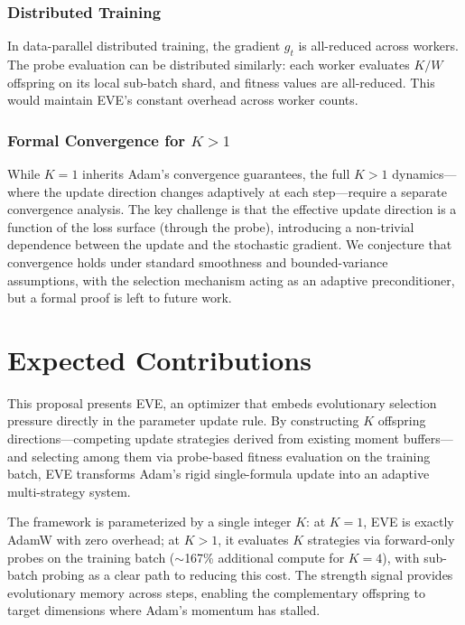 \documentclass[12pt]{article}
\begin{document}
\subsubsection{Distributed Training}

In data-parallel distributed training, the gradient $g_t$ is
all-reduced across workers.
The probe evaluation can be distributed similarly: each worker
evaluates $K / W$ offspring on its local sub-batch shard, and
fitness values are all-reduced.
This would maintain EVE's constant overhead across worker counts.

\subsubsection{Formal Convergence for $K > 1$}

While $K = 1$ inherits Adam's convergence guarantees, the full
$K > 1$ dynamics---where the update direction changes adaptively
at each step---require a separate convergence analysis.
The key challenge is that the effective update direction is a function
of the loss surface (through the probe), introducing a non-trivial
dependence between the update and the stochastic gradient.
We conjecture that convergence holds under standard smoothness and
bounded-variance assumptions, with the selection mechanism acting
as an adaptive preconditioner, but a formal proof is left to future
work.


\section{Expected Contributions}
\label{sec:conclusion}

This proposal presents EVE, an optimizer that embeds evolutionary selection
pressure directly in the parameter update rule.
By constructing $K$ offspring directions---competing update strategies
derived from existing moment buffers---and selecting among them via
probe-based fitness evaluation on the training batch, EVE transforms
Adam's rigid single-formula update into an adaptive multi-strategy system.

The framework is parameterized by a single integer $K$:
at $K = 1$, EVE is exactly AdamW with zero overhead;
at $K > 1$, it evaluates $K$ strategies via forward-only probes on the
training batch ($\sim$167\% additional compute for $K = 4$), with
sub-batch probing as a clear path to reducing this cost.
The strength signal provides evolutionary memory across steps,
enabling the complementary offspring to target dimensions where Adam's
momentum has stalled.
\end{document}
